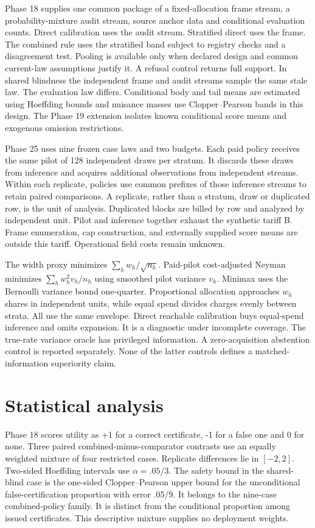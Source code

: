 \documentclass[article,nojss]{jss}
\begin{document}
Phase 18 supplies one common package of a fixed-allocation frame stream,
a probability-mixture audit stream, source anchor data and conditional
evaluation counts. Direct calibration uses the audit stream. Stratified
direct uses the frame. The combined rule uses the stratified band
subject to registry checks and a disagreement test. Pooling is available
only when declared design and common current-law assumptions justify it.
A refusal control returns full support. In shared blindness the
independent frame and audit streams sample the same stale law. The
evaluation law differs. Conditional body and tail means are estimated
using Hoeffding bounds and nuisance masses use Clopper--Pearson bands in
this design. The Phase 19 extension isolates known conditional score
means and exogenous omission restrictions.

Phase 25 uses nine frozen case laws and two budgets. Each paid policy
receives the same pilot of 128 independent draws per stratum. It
discards these draws from inference and acquires additional observations
from independent streams. Within each replicate, policies use common
prefixes of those inference streams to retain paired comparisons. A
replicate, rather than a stratum, draw or duplicated row, is the unit of
analysis. Duplicated blocks are billed by row and analyzed by
independent unit. Pilot and inference together exhaust the synthetic
tariff B. Frame enumeration, cap construction, and externally supplied
score means are outside this tariff. Operational field costs remain
unknown.

The width proxy minimizes \(\sum_h w_h\allowbreak/\sqrt{n_h}\).
Paid-pilot cost-adjusted Neyman minimizes \(\sum_h w_h^2
v_h\allowbreak/n_h\) using smoothed pilot variance \(v_h\). Minimax uses
the Bernoulli variance bound one-quarter. Proportional allocation
approaches \(w_h\) shares in independent units, while equal spend
divides charges evenly between strata. All use the same envelope. Direct
reachable calibration buys equal-spend inference and omits expansion. It
is a diagnostic under incomplete coverage. The true-rate variance oracle
has privileged information. A zero-acquisition abstention control is
reported separately. None of the latter controls defines a
matched-information superiority claim.

\section{Statistical analysis}

Phase 18 scores utility as +1 for a correct certificate, -1 for a false
one and 0 for none. Three paired combined-minus-comparator contrasts use
an equally weighted mixture of four restricted cases. Replicate
differences lie in \([-2,2]\). Two-sided Hoeffding intervals
\citep{hoeffding1963} use \(\alpha=.05/3\). The safety bound in the
shared-blind case is the one-sided Clopper--Pearson \citep{clopper1934}
upper bound for the unconditional false-certification proportion with
error .05/9. It belongs to the nine-case combined-policy family. It is
distinct from the conditional proportion among issued certificates. This
descriptive mixture supplies no deployment weights.
\end{document}
